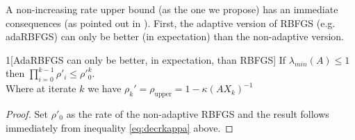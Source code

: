 \documentclass[12pt,conference,compsocconf]{IEEEtran}
\begin{document}
A non-increasing rate upper bound (as the one we propose) has an immediate consequences (as pointed out in \cite{Stich1}). First, the adaptive version of RBFGS (e.g. adaRBFGS) can only be better (in expectation) than the non-adaptive version. 
\begin{customcorollary}{1}[AdaRBFGS can only be better, in expectation, than RBFGS]
If $\lambda_{min}(A) \leq 1$ then $\prod_{i=0}^{k-1}\rho\prime_{i} \leq \rho\prime^{k}_0$. \\
Where at iterate $k$ we have $\rho_k\prime = \rho_{\text{upper}}=1 - \kappa(AX_k)^{-1}$
\begin{proof}
Set $\rho\prime_0$ as the rate of the non-adaptive RBFGS and the result follows immediately from inequality \eqref{eq:decrkappa} above.
\end{proof}
\end{customcorollary}
\end{document}
